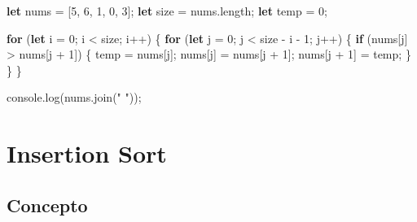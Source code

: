 \documentclass[
  spanish,
  letterpaper,
  DIV=11,
  numbers=noendperiod]{scrreprt}
\newenvironment{Shaded}{\begin{snugshade}}{\end{snugshade}}
\newcommand{\AttributeTok}[1]{\textcolor[rgb]{0.40,0.45,0.13}{#1}}
\newcommand{\BuiltInTok}[1]{\textcolor[rgb]{0.00,0.23,0.31}{#1}}
\newcommand{\ControlFlowTok}[1]{\textcolor[rgb]{0.00,0.23,0.31}{\textbf{#1}}}
\newcommand{\DecValTok}[1]{\textcolor[rgb]{0.68,0.00,0.00}{#1}}
\newcommand{\FunctionTok}[1]{\textcolor[rgb]{0.28,0.35,0.67}{#1}}
\newcommand{\KeywordTok}[1]{\textcolor[rgb]{0.00,0.23,0.31}{\textbf{#1}}}
\newcommand{\NormalTok}[1]{\textcolor[rgb]{0.00,0.23,0.31}{#1}}
\newcommand{\OperatorTok}[1]{\textcolor[rgb]{0.37,0.37,0.37}{#1}}
\newcommand{\StringTok}[1]{\textcolor[rgb]{0.13,0.47,0.30}{#1}}
\begin{document}
\begin{Shaded}
\begin{Highlighting}[]
\KeywordTok{let}\NormalTok{ nums }\OperatorTok{=}\NormalTok{ [}\DecValTok{5}\OperatorTok{,} \DecValTok{6}\OperatorTok{,} \DecValTok{1}\OperatorTok{,} \DecValTok{0}\OperatorTok{,} \DecValTok{3}\NormalTok{]}\OperatorTok{;}
\KeywordTok{let}\NormalTok{ size }\OperatorTok{=}\NormalTok{ nums}\OperatorTok{.}\AttributeTok{length}\OperatorTok{;}
\KeywordTok{let}\NormalTok{ temp }\OperatorTok{=} \DecValTok{0}\OperatorTok{;}

\ControlFlowTok{for}\NormalTok{ (}\KeywordTok{let}\NormalTok{ i }\OperatorTok{=} \DecValTok{0}\OperatorTok{;}\NormalTok{ i }\OperatorTok{\textless{}}\NormalTok{ size}\OperatorTok{;}\NormalTok{ i}\OperatorTok{++}\NormalTok{) \{}
    \ControlFlowTok{for}\NormalTok{ (}\KeywordTok{let}\NormalTok{ j }\OperatorTok{=} \DecValTok{0}\OperatorTok{;}\NormalTok{ j }\OperatorTok{\textless{}}\NormalTok{ size }\OperatorTok{{-}}\NormalTok{ i }\OperatorTok{{-}} \DecValTok{1}\OperatorTok{;}\NormalTok{ j}\OperatorTok{++}\NormalTok{) \{}
        \ControlFlowTok{if}\NormalTok{ (nums[j] }\OperatorTok{\textgreater{}}\NormalTok{ nums[j }\OperatorTok{+} \DecValTok{1}\NormalTok{]) \{}
\NormalTok{            temp }\OperatorTok{=}\NormalTok{ nums[j]}\OperatorTok{;}
\NormalTok{            nums[j] }\OperatorTok{=}\NormalTok{ nums[j }\OperatorTok{+} \DecValTok{1}\NormalTok{]}\OperatorTok{;}
\NormalTok{            nums[j }\OperatorTok{+} \DecValTok{1}\NormalTok{] }\OperatorTok{=}\NormalTok{ temp}\OperatorTok{;}
\NormalTok{        \}}
\NormalTok{    \}}
\NormalTok{\}}

\BuiltInTok{console}\OperatorTok{.}\FunctionTok{log}\NormalTok{(nums}\OperatorTok{.}\FunctionTok{join}\NormalTok{(}\StringTok{" "}\NormalTok{))}\OperatorTok{;}
\end{Highlighting}
\end{Shaded}

\section{\texorpdfstring{\textbf{Insertion
Sort}}{Insertion Sort}}\label{insertion-sort}

\subsection{\texorpdfstring{\textbf{Concepto}}{Concepto}}\label{concepto-1}
\end{document}
